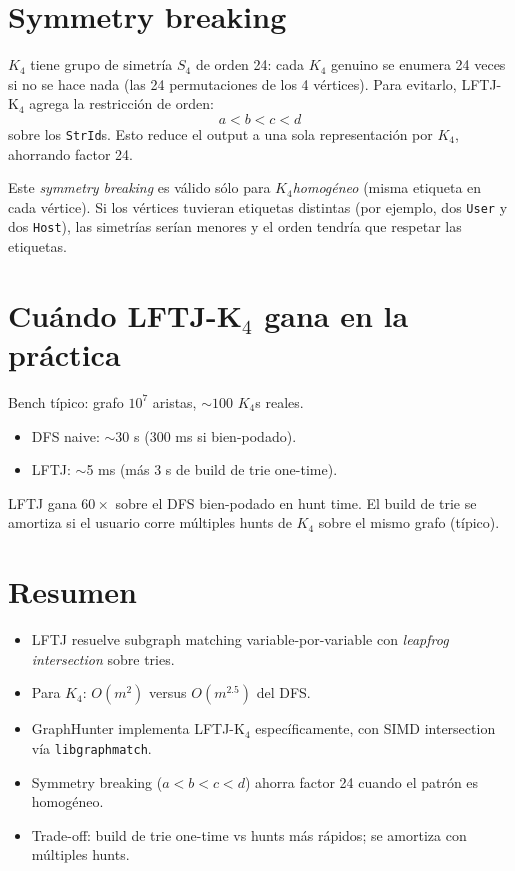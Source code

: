 \section{Symmetry breaking}

\(K_4\) tiene grupo de simetría \(S_4\) de orden 24: cada
\(K_4\) genuino se enumera 24 veces si no se hace nada (las 24
permutaciones de los 4 vértices). Para evitarlo, LFTJ-K\(_4\)
agrega la restricción de orden:
\[
a < b < c < d
\]
\noindent
sobre los \texttt{StrId}s. Esto reduce el output a una sola
representación por \(K_4\), ahorrando factor 24.

\begin{nota}
Este \emph{symmetry breaking} es válido sólo para
\(K_4\)\emph{homogéneo} (misma etiqueta en cada vértice). Si los
vértices tuvieran etiquetas distintas (por ejemplo, dos
\texttt{User} y dos \texttt{Host}), las simetrías serían menores y
el orden tendría que respetar las etiquetas.
\end{nota}

\section{Cuándo LFTJ-K\(_4\) gana en la práctica}

Bench típico: grafo \(10^7\) aristas, \(\sim 100\) \(K_4\)s reales.

\begin{itemize}
    \item DFS naive: $\sim$30 s (300 ms si bien-podado).
    \item LFTJ: $\sim$5 ms (más 3 s de build de trie one-time).
\end{itemize}

\noindent
LFTJ gana \(60\times\) sobre el DFS bien-podado en hunt time. El
build de trie se amortiza si el usuario corre múltiples hunts de
\(K_4\) sobre el mismo grafo (típico).

\section{Resumen}

\begin{itemize}
    \item LFTJ resuelve subgraph matching variable-por-variable
    con \emph{leapfrog intersection} sobre tries.
    \item Para \(K_4\): \(O(m^2)\) versus \(O(m^{2.5})\) del DFS.
    \item GraphHunter implementa LFTJ-K\(_4\) específicamente,
    con SIMD intersection vía \texttt{libgraphmatch}.
    \item Symmetry breaking (\(a < b < c < d\)) ahorra factor 24
    cuando el patrón es homogéneo.
    \item Trade-off: build de trie one-time vs hunts más rápidos;
    se amortiza con múltiples hunts.
\end{itemize}

